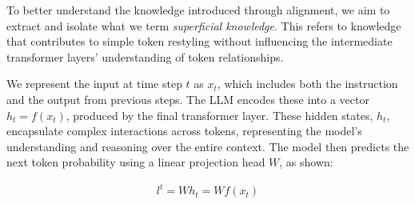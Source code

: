 

To better understand the knowledge introduced through alignment, we aim to extract and isolate what we term \textit{superficial knowledge}. This refers to knowledge that contributes to simple token restyling without influencing the intermediate transformer layers' understanding of token relationships. 

We represent the input at time step $t$ as $x_t$, which includes both the instruction and the output from previous steps. The LLM encodes these into a vector $h_{t}=f(x_t)$, produced by the final transformer layer. These hidden states, $h_t$, encapsulate complex interactions across tokens, representing the model’s understanding and reasoning over the entire context.
The model then predicts the next token probability using a linear projection head $W$, as shown:

\begin{align} 
l^t = W h_t = W f(x_t)
\end{align}

